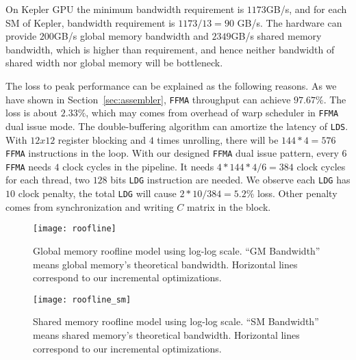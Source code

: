 On Kepler GPU the minimum bandwidth requirement is $1173$GB/s, and for each SM of Kepler, bandwidth requirement is
$1173/13=90$ GB/s.
The hardware can provide $200$GB/s global memory bandwidth and $2349$GB/s shared memory bandwidth, which is
higher than requirement, and hence neither bandwidth of shared width nor global memory will be bottleneck.

The loss to peak performance can be explained as the following reasons. As we have shown in 
Section~\ref{sec:assembler}, {\tt FFMA} throughput can achieve $97.67\%$. The loss is about $2.33\%$, which may comes 
from overhead of warp scheduler in {\tt FFMA} dual issue mode. The double-buffering algorithm can amortize the latency 
of {\tt LDS}.
With $12x12$ register blocking and $4$ times unrolling, there will be $144*4=576$ {\tt FFMA} instructions in the loop.
With our designed {\tt FFMA} dual issue pattern, every $6$ {\tt FFMA} needs $4$ clock cycles in the pipeline.
It needs $4*144*4/6=384$ clock cycles for each thread,  two $128$ bits {\tt LDG} instruction are needed.
We observe each {\tt LDG} has $10$ clock penalty, the total {\tt LDG} will cause $2*10/384 = 5.2\%$ loss. Other penalty 
comes from synchronization and writing $C$ matrix in the block.


\begin{figure}[htbp]
\begin{center}
\texttt{[image: roofline]}
    \caption{Global memory roofline model using log-log scale. ``GM Bandwidth'' means global memory's theoretical bandwidth. Horizontal lines correspond to our incremental optimizations.}
\label{fig:roofline}
\end{center}
\end{figure}


\begin{figure}[htbp]
\begin{center}
\texttt{[image: roofline\_sm]}
    \caption{Shared memory roofline model using log-log scale. ``SM Bandwidth'' means shared memory's theoretical bandwidth. Horizontal lines correspond to our incremental optimizations.}
\label{fig:roofline}
\end{center}
\end{figure}
